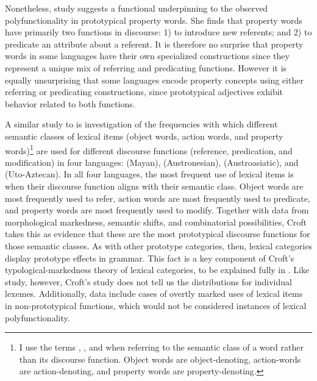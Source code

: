 Nonetheless,  study suggests a functional underpinning to the observed polyfunctionality in prototypical property words. She finds that property words have primarily two functions in discourse: 1) to introduce new referents; and 2) to predicate an attribute about a referent. It is therefore no surprise that property words in some languages have their own specialized constructions since they represent a unique mix of referring and predicating functions. However it is equally unsurprising that some languages encode property concepts using either referring or predicating constructions, since prototypical adjectives exhibit behavior related to both functions.

A similar study to  is  investigation of the frequencies with which different semantic classes of lexical items (object words, action words, and property words)\footnote{I use the terms , , and  when referring to the semantic class of a word rather than its discourse function. Object words are object-denoting, action-words are action-denoting, and property words are property-denoting.} are used for different discourse functions (reference, predication, and modification) in four languages:  (Mayan),  (Austronesian),  (Austroasiatic), and  (Uto-Aztecan). In all four languages, the most frequent use of lexical items is when their discourse function aligns with their semantic class. Object words are most frequently used to refer, action words are most frequently used to predicate, and property words are most frequently used to modify. Together with data from morphological markedness, semantic shifts, and combinatorial possibilities, Croft takes this as evidence that these are the most prototypical discourse functions for those semantic classes. As with other prototype categories, then, lexical categories display prototype effects in grammar. This fact is a key component of Croft's typological-markedness theory of lexical categories, to be explained fully in . Like  study, however, Croft's study does not tell us the distributions for individual lexemes. Additionally,  data include cases of overtly marked uses of lexical items in non-prototypical functions, which would not be considered instances of lexical polyfunctionality.

